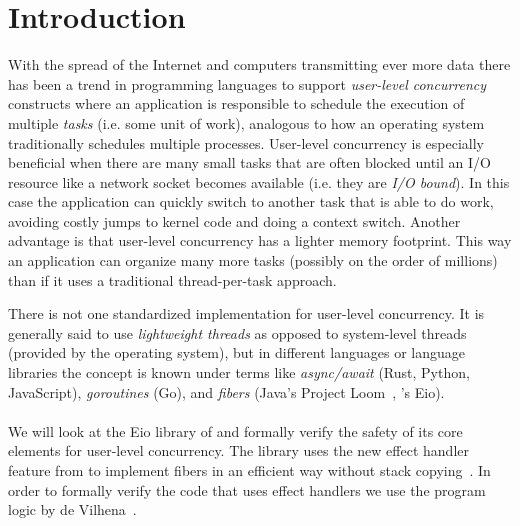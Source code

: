 \section{Introduction}
\label{sec:introduction}

With the spread of the Internet and computers transmitting ever more data there has been a trend in programming languages to support \emph{user-level concurrency} constructs
where an application is responsible to schedule the execution of multiple \emph{tasks} (i.e. some unit of work), analogous to how an operating system traditionally schedules multiple processes.
User-level concurrency is especially beneficial when there are many small tasks that are often blocked until an I/O resource like a network socket becomes available (i.e. they are \emph{I/O bound}).
In this case the application can quickly switch to another task that is able to do work, avoiding costly jumps to kernel code and doing a context switch.
Another advantage is that user-level concurrency has a lighter memory footprint.
This way an application can organize many more tasks (possibly on the order of millions) than if it uses a traditional thread-per-task approach.

There is not one standardized implementation for user-level concurrency.
It is generally said to use \emph{lightweight threads} as opposed to system-level threads (provided by the operating system), but in different languages or language libraries the concept is known under terms
like \emph{async/await} (Rust, Python, JavaScript), \emph{goroutines} (Go), and \emph{fibers} (Java's Project Loom~\cite{jloom}, \ocf{}'s Eio).

\paragraph{}

We will look at the Eio library of \ocf{} and formally verify the safety of its core elements for user-level concurrency.
The library uses the new effect handler feature from \ocf{} to implement fibers in an efficient way without stack copying~\cite{ocamleff}.
In order to formally verify the code that uses effect handlers we use the \hazel{} program logic by de Vilhena~\cite{de2022proof}.

